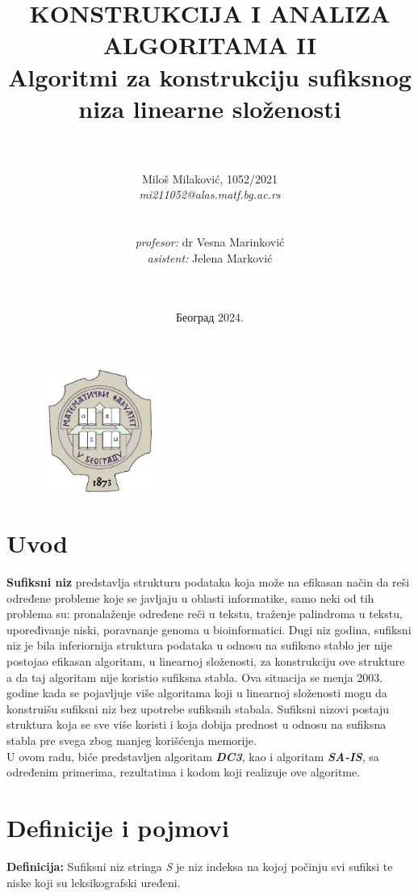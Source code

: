 \documentclass{article}
\title{\textbf{KONSTRUKCIJA I ANALIZA ALGORITAMA II} \\
\vspace{25}
\Large{\textbf{Algoritmi za konstrukciju sufiksnog niza linearne složenosti}}}
\author{ \\\\Miloš Milaković, 1052/2021 \\ \textit{mi211052@alas.matf.bg.ac.rs} \\\\\\
        \textit{profesor:} dr Vesna Marinković \\
        \textit{asistent:} Jelena Marković \\\\\\}
\date{Београд 2024.}
\begin{document}
\maketitle
\thispagestyle{empty} 

\vspace{17}
\begin{figure}[h!]
    \centering
    \includegraphics[width=4cm, height=4cm]{grb.png}
\end{figure} 

\newpage
\tableofcontents

\newpage
\section{Uvod}
\textbf{Sufiksni niz} predstavlja strukturu podataka koja može na efikasan način da reši određene probleme koje se javljaju u oblasti informatike, samo neki od tih problema su: pronalaženje određene reči u tekstu, traženje palindroma u tekstu, upoređivanje niski, poravnanje genoma u bioinformatici. Dugi niz godina, sufiksni niz je bila inferiornija struktura podataka u odnosu na sufiksno stablo jer nije postojao efikasan algoritam, u linearnoj složenosti, za konstrukciju ove strukture a da taj algoritam nije koristio sufiksna stabla. Ova situacija se menja 2003. godine kada se pojavljuje više algoritama koji u linearnoj složenosti mogu da konstruišu sufiksni niz bez upotrebe sufiksnih stabala. Sufiksni nizovi postaju struktura koja se sve više koristi i koja dobija prednost u odnosu na sufiksna stabla pre svega zbog manjeg korišćenja memorije.\\

U ovom radu, biće predstavljen algoritam \textit{\textbf{DC3}}, kao i algoritam \textit{\textbf{SA-IS}}, sa određenim primerima, rezultatima i kodom koji realizuje ove algoritme.

\section{Definicije i pojmovi}
\textbf{Definicija:} Sufiksni niz stringa \textit{S} je niz indeksa na kojoj počinju svi sufiksi te niske koji su leksikografski uređeni.\\
\end{document}
